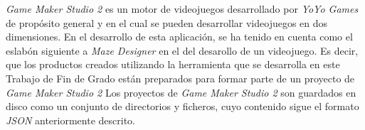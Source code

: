 \textit{Game Maker Studio 2}\cite{gamemaker} es un motor de videojuegos desarrollado por \textit{YoYo Games} de propósito general y en el cual se pueden desarrollar videojuegos en dos dimensiones.
En el desarrollo de esta aplicación, se ha tenido en cuenta como el eslabón siguiente a \textit{Maze Designer} en el  del desarollo de un videojuego. Es decir, que los productos creados utilizando la herramienta que se desarrolla en este Trabajo de Fin de Grado están preparados para formar parte de un proyecto de \textit{Game Maker Studio 2}
Los proyectos de \textit{Game Maker Studio 2} son guardados en disco como un conjunto de directorios y ficheros, cuyo contenido sigue el formato \textit{JSON} anteriormente descrito.
